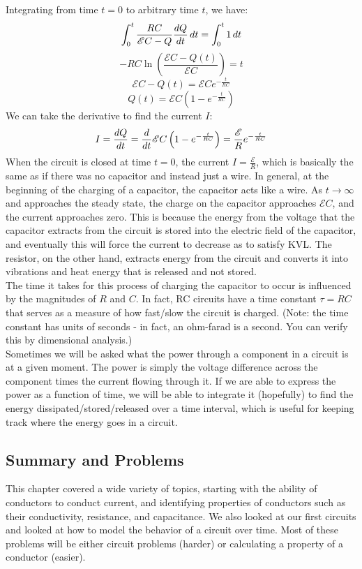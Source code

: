 Integrating from time $t=0$ to arbitrary time $t$, we have:
\[
    \int_0^t\frac{RC}{\mathscr{E}C-Q}\frac{d Q}{d t}\, dt = \int_0^t 1 \, dt
\]
\[
    -RC \ln\left(\frac{\mathscr{E}C-Q(t)}{\mathscr{E}C}\right) = t
\]
\[
    \mathscr{E}C-Q(t) = \mathscr{E}Ce^{-\frac{t}{RC}}
\]
\[
    Q(t) = \mathscr{E}C\left(1-e^{-\frac{t}{RC}}\right)
\]
We can take the derivative to find the current $I$:
\[
	I = \frac{d Q}{d t} = \frac{d }{d t} \mathscr{E}C\left(1-e^{-\frac{t}{RC}}\right) = \frac{\mathscr{E}}{R}e^{-\frac{t}{RC}}
\]
When the circuit is closed at time $t=0$, the current $I = \frac{\mathscr{E}}{R}$, which is basically the same as if there was no capacitor and instead just a wire. In general, at the beginning of the charging of a capacitor, the capacitor acts like a wire. As $t \to \infty$ and approaches the steady state, the charge on the capacitor approaches $\mathscr{E} C$, and the current approaches zero. This is because the energy from the voltage that the capacitor extracts from the circuit is stored into the electric field of the capacitor, and eventually this will force the current to decrease as to satisfy KVL. The resistor, on the other hand, extracts energy from the circuit and converts it into vibrations and heat energy that is released and not stored.\\
The time it takes for this process of charging the capacitor to occur is influenced by the magnitudes of $R$ and $C$.  In fact, RC circuits have a time constant $\tau = RC$ that serves as a measure of how fast/slow the circuit is charged. (Note: the time constant has units of seconds - in fact, an ohm-farad is a second. You can verify this by dimensional analysis.)\\
Sometimes we will be asked what the power through a component in a circuit is at a given moment. The power is simply the voltage difference across the component times the current flowing through it. If we are able to express the power as a function of time, we will be able to integrate it (hopefully) to find the energy dissipated/stored/released over a time interval, which is useful for keeping track where the energy goes in a circuit. 
\subsection{Summary and Problems}
This chapter covered a wide variety of topics, starting with the ability of conductors to conduct current, and identifying properties of conductors such as their conductivity, resistance, and capacitance. We also looked at our first circuits and looked at how to model the behavior of a circuit over time. Most of these problems will be either circuit problems (harder) or calculating a property of a conductor (easier).\\

